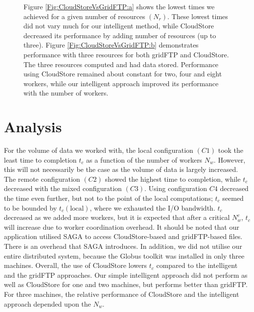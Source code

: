 \documentclass{rspublic}
\begin{document}
\begin{figure}
\begin{center}
{\label{Fig:CloudStoreVsGridFTP:b}
}
\caption{Figure \ref{Fig:CloudStoreVsGridFTP:a}
 shows the lowest times we achieved for a given number of resources
 $(N_{r})$. These lowest times did not vary much for our intelligent
 method, while CloudStore decreased its performance by adding number of
 resources (up to three). Figure \ref{Fig:CloudStoreVsGridFTP:b}
 demonstrates performance with three resources for both gridFTP and
 CloudStore. The three resources computed and had data stored.
 Performance using CloudStore remained about constant for two, four and
 eight workers, while our intelligent approach improved its performance
 with the number of workers.}
\label{Fig:CloudStoreVsGridFTP}
\end{center}
\vspace{-0.3cm}
\end{figure}

%


\section{Analysis}

For the volume of data we worked with, the local configuration $(C1)$
took the least time to completion $t_c$ as a function of the number of
workers $N_w$. However, this will not necessarily be the case as the
volume of data is largely increased.  The remote configuration $(C2)$
showed the highest time to completion, while $t_c$ decreased with the
mixed configuration $(C3)$. Using configuration $C4$ decreased the
time even further, but not to the point of the local computations;
$t_c$ seemed to be bounded by $t_c(\mbox{local})$, where we exhausted
the I/O bandwidth.  $t_c$ decreased as we added more workers, but it
is expected that after a critical $N^c_w$, $t_c$ will increase due to
worker coordination overhead. It should be noted that our application
utilised SAGA to access CloudStore-based and gridFTP-based
files. There is an overhead that SAGA introduces. In addition, we did
not utilise our entire distributed system, because the Globus toolkit
was installed in only three machines.  Overall, the use of CloudStore
lowers $t_c$ compared to the intelligent and the gridFTP
approaches. Our simple intelligent approach did not perform as well as
CloudStore for one and two machines, but performs better than gridFTP.
For three machines, the relative performance of CloudStore and the
intelligent approach depended upon the $N_w$.
\end{document}
